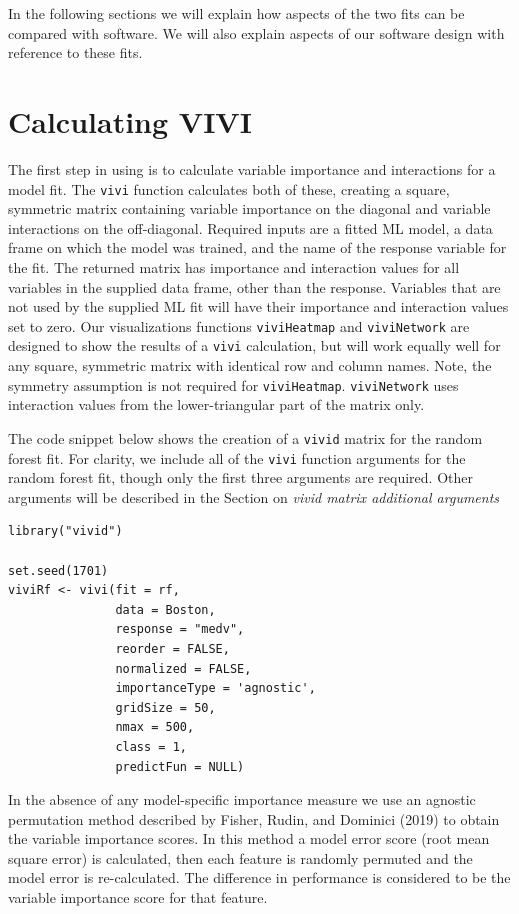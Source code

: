 In the following sections we will explain how aspects of the two fits can be compared with  software. We will also explain aspects of our software design with reference to these fits.

\hypertarget{data}{%
\section{Calculating VIVI}\label{data}}

The first step in using  is to calculate variable importance and interactions for a model fit.
The \texttt{vivi} function calculates both of these, creating a square, symmetric matrix containing variable importance on the diagonal and variable interactions on the off-diagonal. Required inputs are a fitted ML model, a data frame on which the model was trained, and the name of the response variable for the fit. The returned matrix has importance and interaction values for all variables in the supplied data frame, other than the response. Variables that are not used by the supplied ML fit will have their importance and interaction values set to zero. Our visualizations functions \texttt{viviHeatmap} and \texttt{viviNetwork} are designed to show the results of a \texttt{vivi} calculation, but will work equally well for any square, symmetric matrix with identical row and column names. Note, the symmetry assumption is not required for \texttt{viviHeatmap}. \texttt{viviNetwork} uses interaction values from the lower-triangular part of the matrix only.

The code snippet below shows the creation of a \texttt{vivid} matrix for the random forest fit. For clarity, we include all of the \texttt{vivi} function arguments for the random forest fit, though only the first three arguments are required. Other arguments will be described in the Section on \emph{vivid matrix additional arguments}

\begin{verbatim}
library("vivid")

set.seed(1701)
viviRf <- vivi(fit = rf,
               data = Boston,
               response = "medv",
               reorder = FALSE,
               normalized = FALSE,
               importanceType = 'agnostic',
               gridSize = 50,
               nmax = 500,
               class = 1,
               predictFun = NULL)
\end{verbatim}

In the absence of any model-specific importance measure we use an agnostic permutation method described by Fisher, Rudin, and Dominici (2019) to obtain the variable importance scores. In this method a model error score (root mean square error) is calculated, then each feature is randomly permuted and the model error is re-calculated. The difference in performance is considered to be the variable importance score for that feature.

